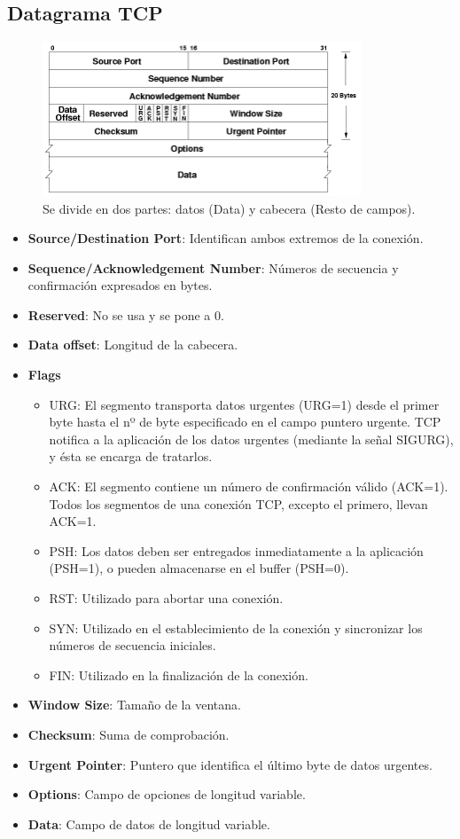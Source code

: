 \subsection{Datagrama TCP}
\begin{figure}[H]
    \centering
    \includegraphics[width=0.85\textwidth]{img/TCPformat.png}
    \caption{Se divide en dos partes: datos (Data) y cabecera (Resto de campos).}
\end{figure}
\begin{itemize}
    \item \textbf{Source/Destination Port}: Identifican ambos extremos de la conexión.
    \item \textbf{Sequence/Acknowledgement Number}: Números de secuencia y confirmación expresados en bytes.
    \item \textbf{Reserved}: No se usa y se pone a 0.
    \item \textbf{Data offset}: Longitud de la cabecera.
    \item \textbf{Flags}
    \begin{itemize}
        \item URG: El segmento transporta datos urgentes (URG=1) desde el primer byte hasta el nº de byte especificado en el campo puntero urgente. TCP notifica a la aplicación de los datos urgentes (mediante la señal SIGURG), y ésta se encarga de tratarlos.
        \item ACK: El segmento contiene un número de confirmación válido (ACK=1). Todos los segmentos de una conexión TCP, excepto el primero, llevan ACK=1.
        \item PSH: Los datos deben ser entregados inmediatamente a la aplicación (PSH=1), o pueden almacenarse en el buffer (PSH=0).
        \item RST: Utilizado para abortar una conexión.
        \item SYN: Utilizado en el establecimiento de la conexión y sincronizar los números de
secuencia iniciales.
        \item FIN: Utilizado en la finalización de la conexión.
    \end{itemize}
    \item \textbf{Window Size}: Tamaño de la ventana.
    \item \textbf{Checksum}: Suma de comprobación.
    \item \textbf{Urgent Pointer}: Puntero que identifica el último byte de datos urgentes.
    \item \textbf{Options}: Campo de opciones de longitud variable.
    \item \textbf{Data}: Campo de datos de longitud variable.
\end{itemize}
